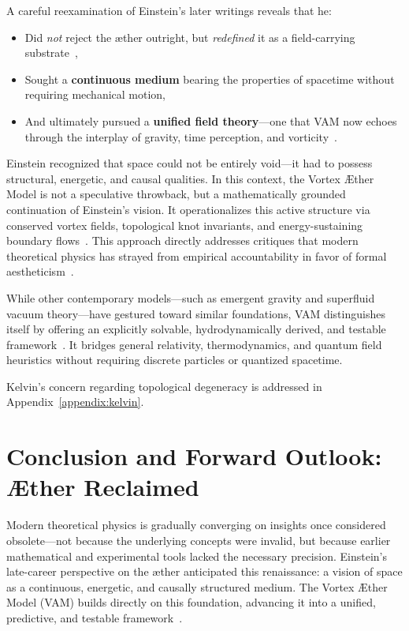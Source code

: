 A careful reexamination of Einstein's later writings reveals that he:
\begin{itemize}
    \item Did \emph{not} reject the æther outright, but \emph{redefined} it as a field-carrying substrate~\cite{einstein1920aether},
    \item Sought a \textbf{continuous medium} bearing the properties of spacetime without requiring mechanical motion,
    \item And ultimately pursued a \textbf{unified field theory}—one that VAM now echoes through the interplay of gravity, time perception, and vorticity~\cite{VAM-8, VAM-14}.
\end{itemize}

Einstein recognized that space could not be entirely void—it had to possess structural, energetic, and causal qualities. In this context, the Vortex Æther Model is not a speculative throwback, but a mathematically grounded continuation of Einstein's vision. It operationalizes this active structure via conserved vortex fields, topological knot invariants, and energy-sustaining boundary flows~\cite{VAM-8, VAM-11, VAM-14}.
This approach directly addresses critiques that modern theoretical physics has strayed from empirical accountability in favor of formal aestheticism~\cite{hossenfelder2018lost}.


While other contemporary models—such as emergent gravity and superfluid vacuum theory—have gestured toward similar foundations, VAM distinguishes itself by offering an explicitly solvable, hydrodynamically derived, and testable framework~\cite{VAM-8, VAM-14, VAM-15}. It bridges general relativity, thermodynamics, and quantum field heuristics without requiring discrete particles or quantized spacetime.

Kelvin's concern regarding topological degeneracy is addressed in Appendix~\ref{appendix:kelvin}.


\section*{Conclusion and Forward Outlook: Æther Reclaimed}

Modern theoretical physics is gradually converging on insights once considered obsolete—not because the underlying concepts were invalid, but because earlier mathematical and experimental tools lacked the necessary precision. Einstein’s late-career perspective on the æther anticipated this renaissance: a vision of space as a continuous, energetic, and causally structured medium. The Vortex Æther Model (VAM) builds directly on this foundation, advancing it into a unified, predictive, and testable framework~\cite{VAM-8, VAM-13, VAM-14}.

